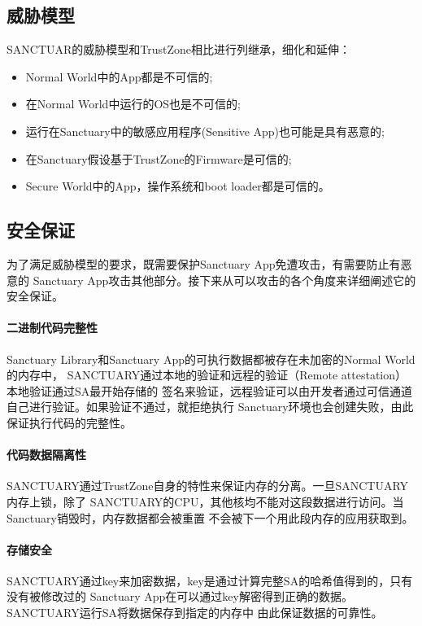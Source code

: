 \subsection{威胁模型}
SANCTUAR的威胁模型和TrustZone相比进行列继承，细化和延伸：
\begin{itemize}
    \item
    Normal World中的App都是不可信的;
    \item
    在Normal World中运行的OS也是不可信的;
    \item 
    运行在Sanctuary中的敏感应用程序(Sensitive App)也可能是具有恶意的;
    \item
    在Sanctuary假设基于TrustZone的Firmware是可信的;
    \item
    Secure World中的App，操作系统和boot loader都是可信的。
\end{itemize}

\subsection{安全保证}
为了满足威胁模型的要求，既需要保护Sanctuary App免遭攻击，有需要防止有恶意的
Sanctuary App攻击其他部分。接下来从可以攻击的各个角度来详细阐述它的安全保证。

\paragraph{二进制代码完整性}
Sanctuary Library和Sanctuary App的可执行数据都被存在未加密的Normal World的内存中，
SANCTUARY通过本地的验证和远程的验证（Remote attestation）本地验证通过SA最开始存储的
签名来验证，远程验证可以由开发者通过可信通道自己进行验证。如果验证不通过，就拒绝执行
Sanctuary环境也会创建失败，由此保证执行代码的完整性。

\paragraph{代码数据隔离性}
SANCTUARY\cite{trustZone-p1}通过TrustZone自身的特性来保证内存的分离。一旦SANCTUARY内存上锁，除了
SANCTUARY的CPU，其他核均不能对这段数据进行访问。当Sanctuary销毁时，内存数据都会被重置
不会被下一个用此段内存的应用获取到。

\paragraph{存储安全}
SANCTUARY通过key来加密数据，key是通过计算完整SA的哈希值得到的，只有没有被修改过的
Sanctuary\cite{trustZone-p1} App在可以通过key解密得到正确的数据。SANCTUARY运行SA将数据保存到指定的内存中
由此保证数据的可靠性。

